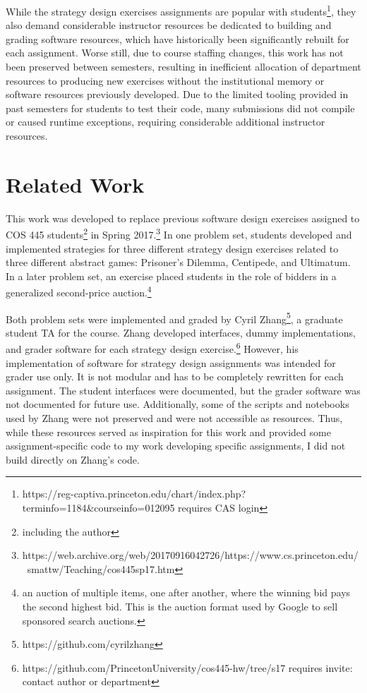 \documentclass[pageno]{jpaper}
\begin{document}
While the strategy design exercises assignments are popular with students\footnote{https://reg-captiva.princeton.edu/chart/index.php?terminfo=1184\&courseinfo=012095 requires CAS login}, they also demand considerable instructor resources be dedicated to building and grading software resources, which have historically been significantly rebuilt for each assignment.
Worse still, due to course staffing changes, this work has not been preserved between semesters, resulting in inefficient allocation of department resources to producing new exercises without the institutional memory or software resources previously developed.
Due to the limited tooling provided in past semesters for students to test their code, many submissions did not compile or caused runtime exceptions, requiring considerable additional instructor resources.


\section*{Related Work}
This work was developed to replace previous software design exercises assigned to COS 445 students\footnote{including the author} in Spring 2017.\footnote{https://web.archive.org/web/20170916042726/https://www.cs.princeton.edu/~smattw/Teaching/cos445sp17.htm}
In one problem set, students developed and implemented strategies for three different strategy design exercises related to three different abstract games: Prisoner's Dilemma, Centipede, and Ultimatum.
In a later problem set, an exercise placed students in the role of bidders in a generalized second-price auction.\footnote{an auction of multiple items, one after another, where the winning bid pays the second highest bid. This is the auction format used by Google to sell sponsored search auctions.}

Both problem sets were implemented and graded by Cyril Zhang\footnote{https://github.com/cyrilzhang}, a graduate student TA for the course.
Zhang developed interfaces, dummy implementations, and grader software for each strategy design exercise.\footnote{https://github.com/PrincetonUniversity/cos445-hw/tree/s17 requires invite: contact author or department}
However, his implementation of software for strategy design assignments was intended for grader use only.
It is not modular and has to be completely rewritten for each assignment.
The student interfaces were documented, but the grader software was not documented for future use.
Additionally, some of the scripts and notebooks used by Zhang were not preserved and were not accessible as resources.
Thus, while these resources served as inspiration for this work and provided some assignment-specific code to my work developing specific assignments, I did not build directly on Zhang's code.
\end{document}
